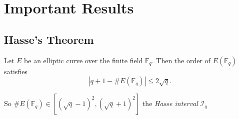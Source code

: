 \documentclass{beamer}%
\newcommand{\F}{\mathbb F}
\theoremstyle{definition}
\begin{document}
\section{Important Results}
\subsection{Hasse's Theorem}
\begin{frame}
\begin{theorem}[Hasse]
Let $E$ be an elliptic curve over the finite field $\F_q$. Then the order of $E(\F_q)$
satisfies
$$\left|q+1-\#E(\F_q)\right|\le 2\sqrt q.$$
\end{theorem}\pause

\vspace*{-6mm}So \alert{$\#E(\F_q)\in [(\sqrt q -1)^2, (\sqrt q+1)^2]$} the \emph{Hasse interval} ${\mathcal I}_q$



\end{frame}
\end{document}
